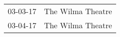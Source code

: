 \begin{supertabular}{p{0.25\columnwidth}p{0.75\columnwidth}}
 03-03-17 &  The Wilma Theatre \\
 03-04-17 &  The Wilma Theatre \\
\end{supertabular}
